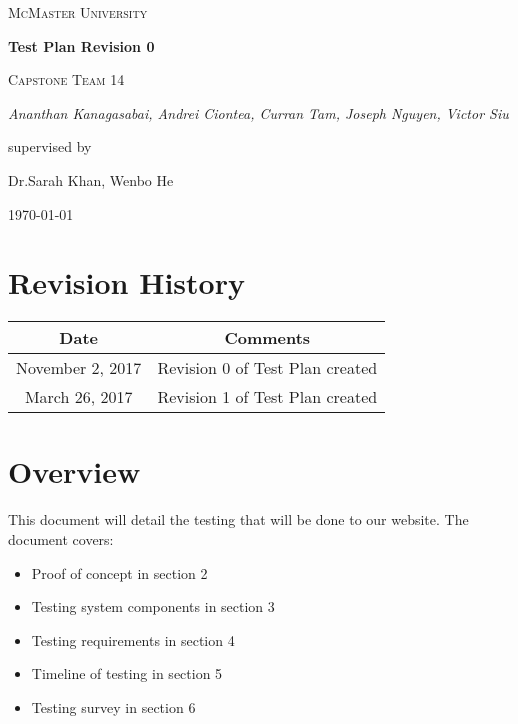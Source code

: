 \documentclass[12pt]{article}
\begin{document}
\begin{titlepage}
	\centering
	{\scshape\LARGE McMaster University \par}
	\vspace{1.5cm}
	{\huge\bfseries Test Plan Revision 0 \par}

	\vspace{1cm}
	{\scshape\Large Capstone Team 14\par}
	{\Large\itshape Ananthan Kanagasabai, Andrei Ciontea, Curran Tam, Joseph Nguyen, Victor Siu \par}
	\vspace{3cm}
	\vfill
	supervised by\par
	Dr.Sarah Khan, Wenbo He

	\vfill
	{\large \today\par}
\end{titlepage}

\newpage

\tableofcontents

\section*{Revision History}
\begin{tabular}{|c|c|}
\hline
\textbf{Date}  & \textbf{Comments} \\ \hline
November 2, 2017 & Revision 0 of Test Plan created \\ \hline
March 26, 2017 & Revision 1 of Test Plan created \\ \hline
\end{tabular}

\newpage

\section{Overview}
This document will detail the testing that will be done to our website. The document covers:
\begin{itemize}
\item Proof of concept in section 2
\item Testing system components in section 3
\item Testing requirements in section 4
\item Timeline of testing in section 5
\item Testing survey in section 6
\end{itemize}
\end{document}
